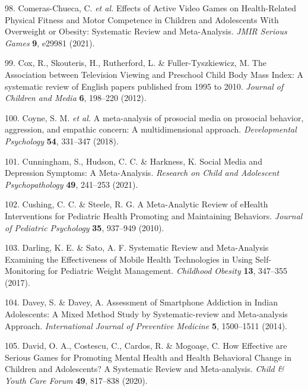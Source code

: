 \documentclass[
  english,
  man]{apa6}
\newenvironment{cslreferences}%
  {}%
  {\par}
\begin{document}
\begin{cslreferences}
\leavevmode\hypertarget{ref-comeras-chuecaEffectsActiveVideo2021a}{}%
98. Comeras-Chueca, C. \emph{et al.} Effects of Active Video Games on Health-Related Physical Fitness and Motor Competence in Children and Adolescents With Overweight or Obesity: Systematic Review and Meta-Analysis. \emph{JMIR Serious Games} \textbf{9}, e29981 (2021).

\leavevmode\hypertarget{ref-coxAssociationTelevisionViewing2012}{}%
99. Cox, R., Skouteris, H., Rutherford, L. \& Fuller-Tyszkiewicz, M. The Association between Television Viewing and Preschool Child Body Mass Index: A systematic review of English papers published from 1995 to 2010. \emph{Journal of Children and Media} \textbf{6}, 198--220 (2012).

\leavevmode\hypertarget{ref-coyneMetaanalysisProsocialMedia2018}{}%
100. Coyne, S. M. \emph{et al.} A meta-analysis of prosocial media on prosocial behavior, aggression, and empathic concern: A multidimensional approach. \emph{Developmental Psychology} \textbf{54}, 331--347 (2018).

\leavevmode\hypertarget{ref-cunninghamSocialMediaDepression2021}{}%
101. Cunningham, S., Hudson, C. C. \& Harkness, K. Social Media and Depression Symptoms: A Meta-Analysis. \emph{Research on Child and Adolescent Psychopathology} \textbf{49}, 241--253 (2021).

\leavevmode\hypertarget{ref-cushingMetaAnalyticReviewEHealth2010}{}%
102. Cushing, C. C. \& Steele, R. G. A Meta-Analytic Review of eHealth Interventions for Pediatric Health Promoting and Maintaining Behaviors. \emph{Journal of Pediatric Psychology} \textbf{35}, 937--949 (2010).

\leavevmode\hypertarget{ref-darlingSystematicReviewMetaAnalysis2017}{}%
103. Darling, K. E. \& Sato, A. F. Systematic Review and Meta-Analysis Examining the Effectiveness of Mobile Health Technologies in Using Self-Monitoring for Pediatric Weight Management. \emph{Childhood Obesity} \textbf{13}, 347--355 (2017).

\leavevmode\hypertarget{ref-daveyAssessmentSmartphoneAddiction2014}{}%
104. Davey, S. \& Davey, A. Assessment of Smartphone Addiction in Indian Adolescents: A Mixed Method Study by Systematic-review and Meta-analysis Approach. \emph{International Journal of Preventive Medicine} \textbf{5}, 1500--1511 (2014).

\leavevmode\hypertarget{ref-davidHowEffectiveAre2020}{}%
105. David, O. A., Costescu, C., Cardos, R. \& Mogoaşe, C. How Effective are Serious Games for Promoting Mental Health and Health Behavioral Change in Children and Adolescents? A Systematic Review and Meta-analysis. \emph{Child \& Youth Care Forum} \textbf{49}, 817--838 (2020).


\end{cslreferences}
\end{document}
